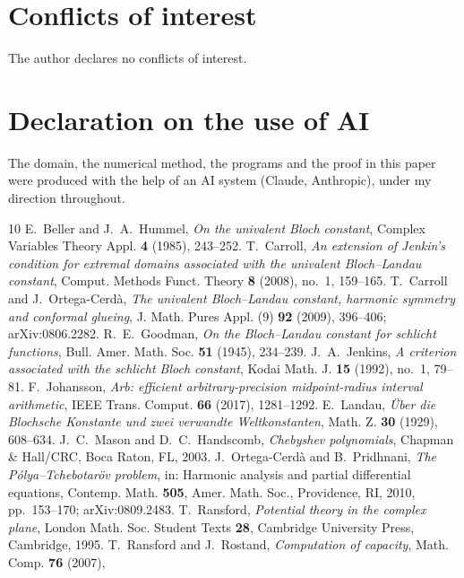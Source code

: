 \documentclass[11pt]{amsart}
\theoremstyle{remark}
\begin{document}
\section*{Conflicts of interest}

The author declares no conflicts of interest.

\section*{Declaration on the use of AI}

The domain, the numerical method, the programs and the proof in this paper were produced with the help of an
AI system (Claude, Anthropic), under my direction throughout.

\begin{thebibliography}{10}
 E.~Beller and J.~A.~Hummel, \emph{On the univalent Bloch constant}, Complex Variables Theory Appl.
\textbf{4} (1985), 243--252.
 T.~Carroll, \emph{An extension of Jenkin's condition for extremal domains associated with the
univalent Bloch--Landau constant}, Comput. Methods Funct. Theory \textbf{8} (2008), no.~1, 159--165.
 T.~Carroll and J.~Ortega-Cerd\`a, \emph{The univalent Bloch--Landau constant, harmonic symmetry and
conformal glueing}, J. Math. Pures Appl. (9) \textbf{92} (2009), 396--406; arXiv:0806.2282.
 R.~E.~Goodman, \emph{On the Bloch--Landau constant for schlicht functions}, Bull. Amer. Math. Soc.
\textbf{51} (1945), 234--239.
 J.~A.~Jenkins, \emph{A criterion associated with the schlicht Bloch constant}, Kodai Math. J.
\textbf{15} (1992), no.~1, 79--81.
 F.~Johansson, \emph{Arb: efficient arbitrary-precision midpoint-radius interval arithmetic}, IEEE
Trans. Comput. \textbf{66} (2017), 1281--1292.
 E.~Landau, \emph{\"Uber die Blochsche Konstante und zwei verwandte Weltkonstanten}, Math. Z.
\textbf{30} (1929), 608--634.
 J.~C.~Mason and D.~C.~Handscomb, \emph{Chebyshev polynomials}, Chapman \& Hall/CRC, Boca Raton, FL,
2003.
 J.~Ortega-Cerd\`a and B.~Pridhnani, \emph{The P\'olya--Tchebotar\"ov problem}, in: Harmonic analysis
and partial differential equations, Contemp. Math. \textbf{505}, Amer. Math. Soc., Providence, RI, 2010,
pp.~153--170; arXiv:0809.2483.
 T.~Ransford, \emph{Potential theory in the complex plane}, London Math. Soc. Student Texts
\textbf{28}, Cambridge University Press, Cambridge, 1995.
 T.~Ransford and J.~Rostand, \emph{Computation of capacity}, Math. Comp. \textbf{76} (2007),

\end{thebibliography}
\end{document}
